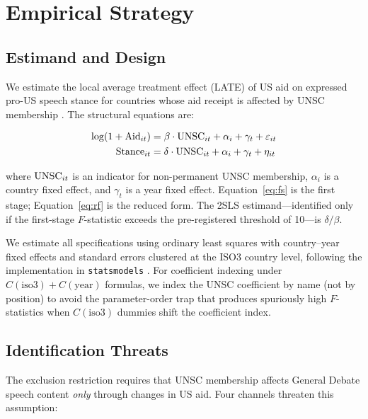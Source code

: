 \section{Empirical Strategy}\label{sec:identification}

\subsection{Estimand and Design}

We estimate the local average treatment effect (LATE) of US aid on expressed pro-US speech stance for countries whose aid receipt is affected by UNSC membership \citep{imbens1994identification}. The structural equations are:

\begin{align}
\log(1 + \text{Aid}_{it}) &= \beta \cdot \text{UNSC}_{it} + \alpha_i + \gamma_t + \varepsilon_{it} \label{eq:fs} \\
\text{Stance}_{it} &= \delta \cdot \text{UNSC}_{it} + \alpha_i + \gamma_t + \eta_{it} \label{eq:rf}
\end{align}

where $\text{UNSC}_{it}$ is an indicator for non-permanent UNSC membership, $\alpha_i$ is a country fixed effect, and $\gamma_t$ is a year fixed effect. Equation~\ref{eq:fs} is the first stage; Equation~\ref{eq:rf} is the reduced form. The 2SLS estimand---identified only if the first-stage $F$-statistic exceeds the pre-registered threshold of 10---is $\delta / \beta$.

We estimate all specifications using ordinary least squares with country--year fixed effects and standard errors clustered at the ISO3 country level, following the implementation in \texttt{statsmodels} \citep{seabold2010statsmodels}. For coefficient indexing under $C(\text{iso3}) + C(\text{year})$ formulas, we index the UNSC coefficient by name (not by position) to avoid the parameter-order trap that produces spuriously high $F$-statistics when $C(\text{iso3})$ dummies shift the coefficient index.

\subsection{Identification Threats}

The exclusion restriction requires that UNSC membership affects General Debate speech content \emph{only} through changes in US aid. Four channels threaten this assumption:

